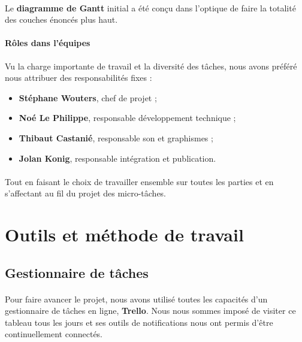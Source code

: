 \paragraph{}
Le \textbf{diagramme de Gantt} initial a été conçu dans l’optique de faire la totalité des couches énoncés plus haut.

\paragraph{Rôles dans l’équipes}
Vu la charge importante de travail et la diversité des tâches, nous avons préféré nous attribuer des responsabilités fixes :

\begin{itemize}
\item \textbf{Stéphane Wouters}, chef de projet ;
\item \textbf{Noé Le Philippe}, responsable développement technique ;
\item \textbf{Thibaut Castanié}, responsable son et graphismes ;
\item \textbf{Jolan Konig}, responsable intégration et publication.
\end{itemize}

\paragraph{}
Tout en faisant le choix de travailler ensemble sur toutes les parties et en s’affectant au fil du projet des micro-tâches.

\section{Outils et méthode de travail}

\subsection{Gestionnaire de tâches}

\paragraph{}
Pour faire avancer le projet, nous avons utilisé toutes les capacités d’un gestionnaire de tâches en ligne, \textbf{Trello}. Nous nous sommes imposé de visiter ce tableau tous les jours et ses outils de notifications nous ont permis d’être continuellement connectés.

